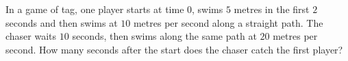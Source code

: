 In a game of tag, one player starts at time $0$, swims $5$ metres in the first $2$ seconds and then swims at $10$ metres per second along a straight path. The chaser waits $10$ seconds, then swims along the same path at $20$ metres per second. How many seconds after the start does the chaser catch the first player?
